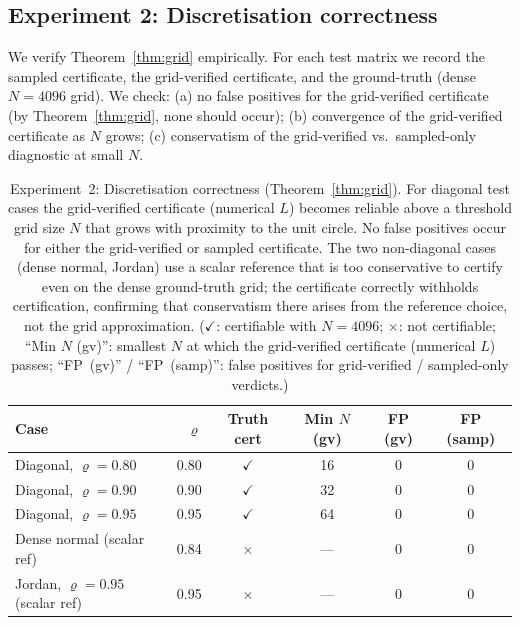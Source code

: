 \documentclass{article}
\theoremstyle{definition}
\begin{document}
\subsection{Experiment 2: Discretisation correctness}

We verify Theorem~\ref{thm:grid} empirically.  For each test matrix we record
the sampled certificate, the grid-verified certificate, and the ground-truth (dense
$N = 4096$ grid).  We check:
(a) no false positives for the grid-verified certificate (by Theorem~\ref{thm:grid},
    none should occur);
(b) convergence of the grid-verified certificate as $N$ grows;
(c) conservatism of the grid-verified vs.\ sampled-only diagnostic at small $N$.

\begin{table}[t]
\centering
\caption{Experiment~2: Discretisation correctness (Theorem~\ref{thm:grid}).
For diagonal test cases the grid-verified certificate (numerical $L$)
becomes reliable above a threshold grid size $N$ that grows with proximity
to the unit circle.  No false positives occur for either the grid-verified or
sampled certificate.  The two non-diagonal cases (dense normal, Jordan) use a
scalar reference that is too conservative to certify even on the dense
ground-truth grid; the certificate correctly withholds certification,
confirming that conservatism there arises from the reference choice, not the
grid approximation.
($\checkmark$: certifiable with $N=4096$; $\times$: not certifiable;
``Min $N$ (gv)'': smallest $N$ at which the grid-verified certificate
(numerical $L$) passes; ``FP~(gv)'' / ``FP~(samp)'': false positives for
grid-verified / sampled-only verdicts.)}
\label{tab:discretisation}
\begin{tabular}{lrcccc}
\toprule
Case & $\varrho$ & Truth cert & Min $N$ (gv) & FP (gv) & FP (samp) \\
\midrule
Diagonal, $\varrho=0.80$ & 0.80 & $\checkmark$ & 16 & 0 & 0 \\
Diagonal, $\varrho=0.90$ & 0.90 & $\checkmark$ & 32 & 0 & 0 \\
Diagonal, $\varrho=0.95$ & 0.95 & $\checkmark$ & 64 & 0 & 0 \\
Dense normal (scalar ref) & 0.84 & $\times$ & --- & 0 & 0 \\
Jordan, $\varrho=0.95$ (scalar ref) & 0.95 & $\times$ & --- & 0 & 0 \\
\bottomrule
\end{tabular}
\end{table}
\end{document}
